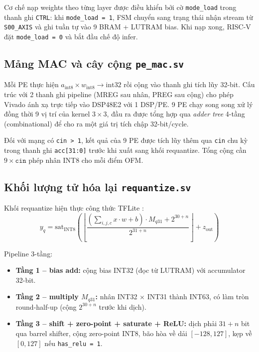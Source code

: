 Cơ chế nạp weights theo từng layer được điều khiển bởi cờ \texttt{mode\_load} trong thanh ghi \texttt{CTRL}: khi \texttt{mode\_load = 1}, FSM chuyển sang trạng thái nhận stream từ \texttt{S00\_AXIS} và ghi tuần tự vào 9 BRAM + LUTRAM bias. Khi nạp xong, RISC-V đặt \texttt{mode\_load = 0} và bắt đầu chế độ infer.

\subsection{Mảng MAC và cây cộng \texttt{pe\_mac.sv}}
Mỗi PE thực hiện $a_{\mathrm{int8}} \times w_{\mathrm{int8}} \to \mathrm{int32}$ rồi cộng vào thanh ghi tích lũy 32-bit. Cấu trúc với 2 thanh ghi pipeline (MREG sau nhân, PREG sau cộng) cho phép Vivado ánh xạ trực tiếp vào DSP48E2 với 1 DSP/PE. 9 PE chạy song song xử lý đồng thời 9 vị trí của kernel $3 \times 3$, đầu ra được tổng hợp qua \textit{adder tree} 4-tầng (combinational) để cho ra một giá trị tích chập 32-bit/cycle.

Đối với mạng có \texttt{cin > 1}, kết quả của 9 PE được tích lũy thêm qua \texttt{cin} chu kỳ trong thanh ghi \texttt{acc[31:0]} trước khi xuất sang khối requantize. Tổng cộng cần $9 \times \texttt{cin}$ phép nhân INT8 cho mỗi điểm OFM.

\subsection{Khối lượng tử hóa lại \texttt{requantize.sv}}
\label{ssec:requantize}
Khối requantize hiện thực công thức TFLite \cite{jacob2018quantization}:
\begin{equation}
    y_{q} = \mathrm{sat}_{\mathrm{INT8}}\!\left(
        \left\lfloor \frac{(\sum_{i,j,c} x \cdot w + b) \cdot M_{q31} + 2^{30+n}}{2^{31+n}} \right\rfloor + z_{\mathrm{out}}
    \right)
\end{equation}

Pipeline 3-tầng:
\begin{itemize}
    \item \textbf{Tầng 1 -- bias add:} cộng bias INT32 (đọc từ LUTRAM) với accumulator 32-bit.
    \item \textbf{Tầng 2 -- multiply $M_{q31}$:} nhân INT32 $\times$ INT31 thành INT63, có làm tròn round-half-up (cộng $2^{30+n}$ trước khi dịch).
    \item \textbf{Tầng 3 -- shift + zero-point + saturate + ReLU:} dịch phải $31 + n$ bit qua barrel shifter, cộng zero-point INT8, bão hòa về dải $[-128, 127]$, kẹp về $[0, 127]$ nếu \texttt{has\_relu = 1}.
\end{itemize}

